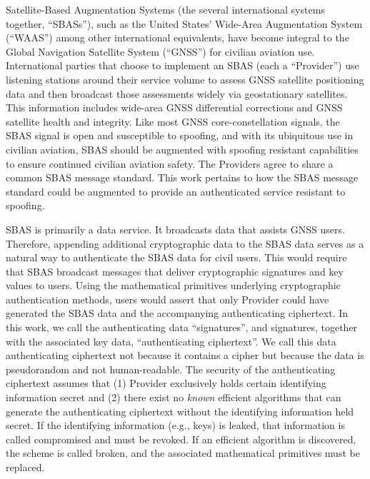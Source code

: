 \documentclass[letterpaper,times]{IONconf/IONconf}
\begin{document}
Satellite-Based Augmentation Systems (the several international systems together, ``SBASs''), such as the United States' Wide-Area Augmentation System (``WAAS'') among other international equivalents, have become integral to the Global Navigation Satellite System (``GNSS'') for civilian aviation use.
International parties that choose to implement an SBAS (each a ``Provider'') use listening stations around their service volume to assess GNSS satellite positioning data and then broadcast those assessments widely via geostationary satellites.
This information includes wide-area GNSS differential corrections and GNSS satellite health and integrity.
Like most GNSS core-constellation signals, the SBAS signal is open and susceptible to spoofing, and with its ubiquitous use in civilian aviation, SBAS should be augmented with spoofing resistant capabilities to ensure continued civilian aviation safety.
The Providers agree to share a common SBAS message standard.
This work pertains to how the SBAS message standard could be augmented to provide an authenticated service resistant to spoofing.

SBAS is primarily a data service.
It broadcasts data that assists GNSS users.
Therefore, appending additional cryptographic data to the SBAS data serves as a natural way to authenticate the SBAS data for civil users.
This would require that SBAS broadcast messages that deliver cryptographic signatures and key values to users.
Using the mathematical primitives underlying cryptographic authentication methods, users would assert that only Provider could have generated the SBAS data and the accompanying authenticating ciphertext.
In this work, we call the authenticating data ``signatures'', and signatures, together with the associated key data, ``authenticating ciphertext''.
We call this data authenticating ciphertext not because it contains a cipher but because the data is pseudorandom and not human-readable.
The security of the authenticating ciphertext assumes that (1) Provider exclusively holds certain identifying information secret and (2) there exist no {\em known} efficient algorithms that can generate the authenticating ciphertext without the identifying information held secret.
If the identifying information (e.g., keys) is leaked, that information is called compromised and must be revoked.
If an efficient algorithm is discovered, the scheme is called broken, and the associated mathematical primitives must be replaced.
\end{document}

